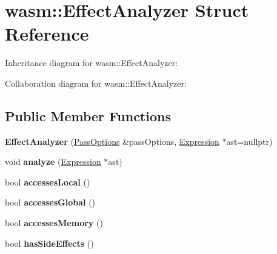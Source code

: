 \hypertarget{structwasm_1_1_effect_analyzer}{}\section{wasm\+:\+:Effect\+Analyzer Struct Reference}
\label{structwasm_1_1_effect_analyzer}


Inheritance diagram for wasm\+:\+:Effect\+Analyzer\+:


Collaboration diagram for wasm\+:\+:Effect\+Analyzer\+:
\subsection*{Public Member Functions}
\begin{DoxyCompactItemize}
\item 
\mbox{\label{structwasm_1_1_effect_analyzer_a6e063afaa7ba5eba5764d8bf1d31e435}} 
{\bfseries Effect\+Analyzer} (\mbox{\hyperlink{structwasm_1_1_pass_options}{Pass\+Options}} \&pass\+Options, \mbox{\hyperlink{classwasm_1_1_expression}{Expression}} $\ast$ast=nullptr)
\item 
\mbox{\label{structwasm_1_1_effect_analyzer_a21ed2bef974a7786cbd1c326a65fbcae}} 
void {\bfseries analyze} (\mbox{\hyperlink{classwasm_1_1_expression}{Expression}} $\ast$ast)
\item 
\mbox{\label{structwasm_1_1_effect_analyzer_ac7679f8cc7f4c0baf18ba3c3124cef75}} 
bool {\bfseries accesses\+Local} ()
\item 
\mbox{\label{structwasm_1_1_effect_analyzer_a504181479dd484b9c8238683d5818be1}} 
bool {\bfseries accesses\+Global} ()
\item 
\mbox{\label{structwasm_1_1_effect_analyzer_ae3aed28cb705961c0a5d940f460e1484}} 
bool {\bfseries accesses\+Memory} ()
\item 
\mbox{\label{structwasm_1_1_effect_analyzer_a00355d5fc16db6d623beedf3e6cbcb96}} 
bool {\bfseries has\+Side\+Effects} ()
\item 
\mbox{\label{structwasm_1_1_effect_analyzer_ac985e10ee4c75fd11f4ebb25e3b87e68}} 

\end{DoxyCompactItemize}
